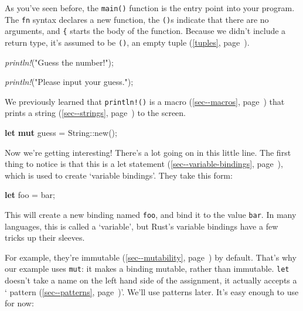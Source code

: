 \documentclass[a4paper,]{book}
\renewcommand*{\hyperlink}[2]{%
 #2 (\autoref{#1}, page~\pageref{#1})}
\newenvironment{Shaded}{\begin{snugshade}}{\end{snugshade}}
\newcommand{\KeywordTok}[1]{\textcolor[rgb]{0.13,0.29,0.53}{\textbf{{#1}}}}
\newcommand{\DataTypeTok}[1]{\textcolor[rgb]{0.13,0.29,0.53}{{#1}}}
\newcommand{\StringTok}[1]{\textcolor[rgb]{0.31,0.60,0.02}{{#1}}}
\newcommand{\PreprocessorTok}[1]{\textcolor[rgb]{0.56,0.35,0.01}{\textit{{#1}}}}
\newcommand{\NormalTok}[1]{{#1}}
\begin{document}
As you've seen before, the \texttt{main()} function is the entry point
into your program. The \texttt{fn} syntax declares a new function, the
\texttt{()}s indicate that there are no arguments, and \texttt{\{}
starts the body of the function. Because we didn't include a return
type, it's assumed to be \texttt{()}, an empty
\protect\hyperlink{tuples}{tuple}.

\begin{Shaded}
\begin{Highlighting}[]
    \PreprocessorTok{println!}\NormalTok{(}\StringTok{"Guess the number!"}\NormalTok{);}

    \PreprocessorTok{println!}\NormalTok{(}\StringTok{"Please input your guess."}\NormalTok{);}
\end{Highlighting}
\end{Shaded}

We previously learned that \texttt{println!()} is a
\protect\hyperlink{sec--macros}{macro} that prints a
\protect\hyperlink{sec--strings}{string} to the screen.

\begin{Shaded}
\begin{Highlighting}[]
    \KeywordTok{let} \KeywordTok{mut} \NormalTok{guess = }\DataTypeTok{String}\NormalTok{::new();}
\end{Highlighting}
\end{Shaded}

Now we're getting interesting! There's a lot going on in this little
line. The first thing to notice is that this is a
\protect\hyperlink{sec--variable-bindings}{let statement}, which is used
to create `variable bindings'. They take this form:

\begin{Shaded}
\begin{Highlighting}[]
\KeywordTok{let} \NormalTok{foo = bar;}
\end{Highlighting}
\end{Shaded}

This will create a new binding named \texttt{foo}, and bind it to the
value \texttt{bar}. In many languages, this is called a `variable', but
Rust's variable bindings have a few tricks up their sleeves.

For example, they're \protect\hyperlink{sec--mutability}{immutable} by
default. That's why our example uses \texttt{mut}: it makes a binding
mutable, rather than immutable. \texttt{let} doesn't take a name on the
left hand side of the assignment, it actually accepts a
`\protect\hyperlink{sec--patterns}{pattern}'. We'll use patterns later.
It's easy enough to use for now:
\end{document}
